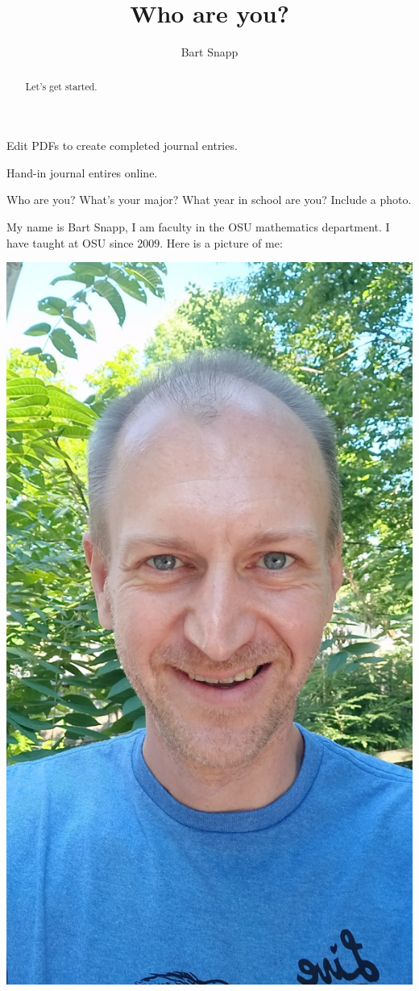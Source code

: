 \documentclass{ximera}
\title{Who are you?}
\author{Bart Snapp}
\begin{document}
\begin{abstract}
  Let's get started.
\end{abstract}
\maketitle

\begin{listOutcomes}
\item{Edit PDFs to create completed journal entries.}
\item{Hand-in journal entires online.}
\end{listOutcomes}
\mynewpage

\begin{question}
  Who are you? What's your major? What year in school are you? Include a photo.
  \begin{freeResponse}
    My name is Bart Snapp, I am faculty in the OSU mathematics
    department. I have taught at OSU since $2009$. Here is a picture
    of me:
    \begin{center}
      \includegraphics[height=.3\textheight]{me.jpg}

\end{center}
\end{freeResponse}
\end{question}
\end{document}
